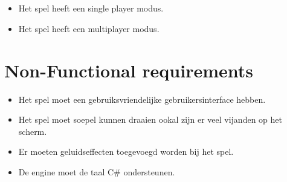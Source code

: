 \subsection{}
\begin{itemize}
    \item Het spel heeft een single player modus.
    \item Het spel heeft een multiplayer modus.
\end{itemize}

\section{Non-Functional requirements}
\begin{itemize}
    \item Het spel moet een gebruiksvriendelijke gebruikersinterface hebben. 
    \item Het spel moet soepel kunnen draaien ookal zijn er veel vijanden op het scherm. 
    \item Er moeten geluidseffecten toegevoegd worden bij het spel.
    \item De engine moet de taal C\# ondersteunen.
\end{itemize}
